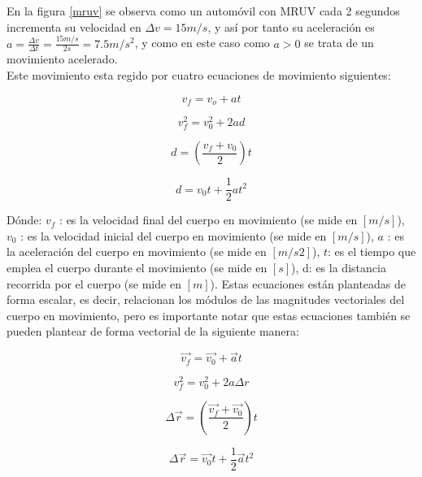 \documentclass[a5paper,pagesize,10pt,bibtotoc,pointlessnumbers,
normalheadings,DIV=9,fleqn,x11names,table,twoside=false]{scrbook}
\begin{document}
En la figura \ref{mruv} se observa como un automóvil con MRUV cada 2 segundos incrementa su velocidad en $\Delta v = 15 m/s$, y 
así por tanto su aceleración es $a = \frac{\Delta v}{\Delta t} = \frac{15 m/s}{2s} = 7.5 m/s^2$, y como en este caso como $a>0$ 
se trata de un movimiento acelerado.\\

Este movimiento esta regido por cuatro ecuaciones de movimiento siguientes:

\begin{equation}
 v_f = v_o + at
\end{equation}

\begin{equation}
 v_f^2 = v_0^2 + 2ad
\end{equation}

\begin{equation}
 d = (\frac{v_f+v_0}{2})t
\end{equation}

\begin{equation}
 d = v_0t+ \frac{1}{2}at^2
\end{equation}

Dónde: $v_f$ : es la velocidad final del cuerpo en movimiento (se mide en $[m/s]$), $v_0$ : es la velocidad inicial del cuerpo en 
movimiento (se mide en $[m/s]$), $a$ : es la aceleración del cuerpo en movimiento (se mide en $[m/s 2]$), $t$: es el tiempo que 
emplea el cuerpo durante el movimiento (se mide en $[s]$), d: es la distancia recorrida por el cuerpo (se mide en $[m]$). Estas 
ecuaciones están planteadas de forma escalar, es decir, relacionan los módulos de las magnitudes vectoriales del cuerpo en 
movimiento, pero es importante notar que estas ecuaciones también se pueden plantear de forma vectorial de la siguiente manera: 

\begin{equation}
\vec{v_f} = \vec{v_0} + \vec{a}t 
\end{equation}

\begin{equation}
 v_f^2 = v_0^2+2a\Delta r
\end{equation}

\begin{equation}
 \Delta \vec{r} = (\frac{\vec{v_f}+\vec{v_0}}{2})t
\end{equation}

\begin{equation}
 \Delta \vec{r} = \vec{v_0}t + \frac{1}{2}\vec{a}t^2
\end{equation}
 
\end{document}
